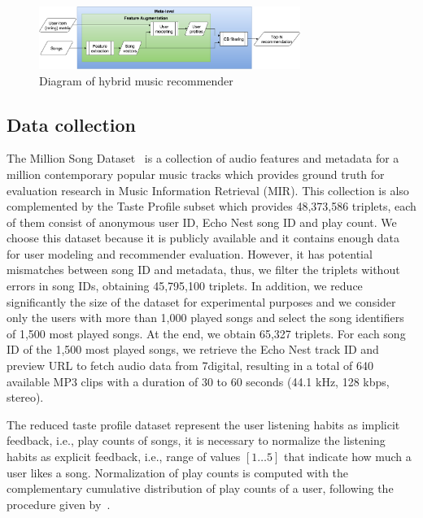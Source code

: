 \documentclass{article}
\begin{document}
\begin{figure}[htb]
	
	\begin{minipage}[b]{1.0\linewidth}
		\centering
		\centerline{\includegraphics[width=8.5cm]{hybrid.png}}
	\end{minipage}
	\caption{Diagram of hybrid music recommender}
	\label{fig:hybrid}
\end{figure}

\subsection{Data collection}
The Million Song Dataset~\cite{Bertin-Mahieux2011} is a collection of audio features and metadata for a million contemporary popular music tracks which provides ground truth for evaluation research in Music Information Retrieval (MIR). This collection is also complemented by the Taste Profile subset which provides 48,373,586 triplets, each of them consist of anonymous user ID, Echo Nest song ID and play count. We choose this dataset because it is publicly available and it contains enough data for user modeling and recommender evaluation. However, it has potential mismatches between song ID and metadata, thus, we filter the triplets without errors in song IDs, obtaining 45,795,100 triplets. In addition, we reduce significantly the size of the dataset for experimental purposes and we consider only the users with more than 1,000 played songs and select the song identifiers of 1,500 most played songs. At the end, we obtain 65,327 triplets. For each song ID of the 1,500 most played songs, we retrieve the Echo Nest track ID and preview URL to fetch audio data from 7digital, resulting in a total of 640 available MP3 clips with a duration of 30 to 60 seconds (44.1 kHz, 128 kbps, stereo).

The reduced taste profile dataset represent the user listening habits as implicit feedback, i.e., play counts of songs, it is necessary to normalize the listening habits as explicit feedback, i.e., range of values $[1\ldots5]$ that indicate how much a user likes a song. Normalization of play counts is computed with the complementary cumulative distribution of play counts of a user, following the procedure given by~\cite{1242}.
\end{document}
